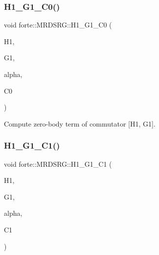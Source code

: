 \mbox{\label{classforte_1_1_m_r_d_s_r_g_a468b964dd4388b1d7da7708a1bfedd21}} 
\subsubsection{\texorpdfstring{H1\+\_\+\+G1\+\_\+\+C0()}{H1\_G1\_C0()}}
{\footnotesize\ttfamily void forte\+::\+M\+R\+D\+S\+R\+G\+::\+H1\+\_\+\+G1\+\_\+\+C0 (\begin{DoxyParamCaption}\item[{Blocked\+Tensor \&}]{H1,  }\item[{Blocked\+Tensor \&}]{G1,  }\item[{const double \&}]{alpha,  }\item[{double \&}]{C0 }\end{DoxyParamCaption})\hspace{0.3cm}{\ttfamily [protected]}}



Compute zero-\/body term of commutator \mbox{[}H1, G1\mbox{]}. 

\mbox{\label{classforte_1_1_m_r_d_s_r_g_a9dbbb14d2b4d9159db8bee7ecb662c7c}} 
\subsubsection{\texorpdfstring{H1\+\_\+\+G1\+\_\+\+C1()}{H1\_G1\_C1()}}
{\footnotesize\ttfamily void forte\+::\+M\+R\+D\+S\+R\+G\+::\+H1\+\_\+\+G1\+\_\+\+C1 (\begin{DoxyParamCaption}\item[{Blocked\+Tensor \&}]{H1,  }\item[{Blocked\+Tensor \&}]{G1,  }\item[{const double \&}]{alpha,  }\item[{Blocked\+Tensor \&}]{C1 }\end{DoxyParamCaption})\hspace{0.3cm}{\ttfamily [protected]}}



